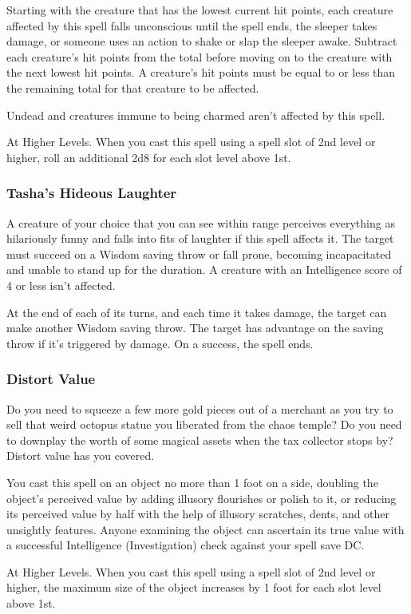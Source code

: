\documentclass[11pt]{article}
\begin{document}
Starting with the creature that has the lowest current hit points, each creature affected by this spell falls unconscious until the spell ends, the sleeper takes damage, or someone uses an action to shake or slap the sleeper awake. Subtract each creature's hit points from the total before moving on to the creature with the next lowest hit points. A creature's hit points must be equal to or less than the remaining total for that creature to be affected.

Undead and creatures immune to being charmed aren't affected by this spell.

At Higher Levels. When you cast this spell using a spell slot of 2nd level or higher, roll an additional 2d8 for each slot level above 1st.
\subsubsection{Tasha's Hideous Laughter}
\label{sec:org2fd942b}
A creature of your choice that you can see within range perceives everything as hilariously funny and falls into fits of laughter if this spell affects it. The target must succeed on a Wisdom saving throw or fall prone, becoming incapacitated and unable to stand up for the duration. A creature with an Intelligence score of 4 or less isn't affected.

At the end of each of its turns, and each time it takes damage, the target can make another Wisdom saving throw. The target has advantage on the saving throw if it's triggered by damage. On a success, the spell ends.
\subsubsection{Distort Value}
\label{sec:orgf03a7ea}
Do you need to squeeze a few more gold pieces out of a merchant as you try to sell that weird octopus statue you liberated from the chaos temple? Do you need to downplay the worth of some magical assets when the tax collector stops by? Distort value has you covered.

You cast this spell on an object no more than 1 foot on a side, doubling the object's perceived value by adding illusory flourishes or polish to it, or reducing its perceived value by half with the help of illusory scratches, dents, and other unsightly features. Anyone examining the object can ascertain its true value with a successful Intelligence (Investigation) check against your spell save DC.

At Higher Levels. When you cast this spell using a spell slot of 2nd level or higher, the maximum size of the object increases by 1 foot for each slot level above 1st.
\end{document}
